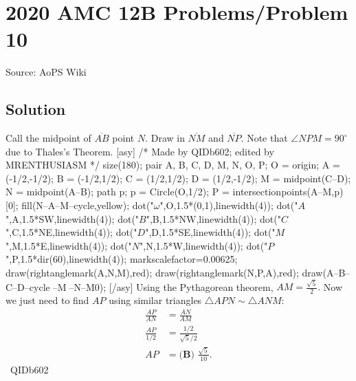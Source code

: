 \documentclass[12pt]{article}
\begin{document}
\section*{{2020 AMC 12B Problems/Problem 10}}
Source: AoPS Wiki

\subsection*{Solution}
Call the midpoint of $\overline{AB}$ point $N.$ Draw in $\overline{NM}$ and $\overline{NP}.$ Note that $\angle{NPM}=90^{\circ}$ due to Thales's Theorem. [asy] /* Made by QIDb602; edited by MRENTHUSIASM */ size(180); pair A, B, C, D, M, N, O, P; O = origin; A = (-1/2,-1/2); B = (-1/2,1/2); C = (1/2,1/2); D = (1/2,-1/2); M = midpoint(C--D); N = midpoint(A--B); path p; p = Circle(O,1/2); P = intersectionpoints(A--M,p)[0]; fill(N--A--M--cycle,yellow); dot("$\omega$",O,1.5*(0,1),linewidth(4)); dot("$A$",A,1.5*SW,linewidth(4)); dot("$B$",B,1.5*NW,linewidth(4)); dot("$C$",C,1.5*NE,linewidth(4)); dot("$D$",D,1.5*SE,linewidth(4)); dot("$M$",M,1.5*E,linewidth(4)); dot("$N$",N,1.5*W,linewidth(4)); dot("$P$",P,1.5*dir(60),linewidth(4)); markscalefactor=0.00625; draw(rightanglemark(A,N,M),red); draw(rightanglemark(N,P,A),red); draw(A--B--C--D--cycle^^A--M^^P--N--M^^p); [/asy] Using the Pythagorean theorem, $AM=\frac{\sqrt{5}}{2}.$ Now we just need to find $AP$ using similar triangles $\triangle APN\sim\triangle ANM:$ \begin{align*} \frac{AP}{AN}&=\frac{AN}{AM} \\ \frac{AP}{1/2}&=\frac{1/2}{\sqrt5/2} \\ AP&=\boxed{\textbf{(B) } \frac{\sqrt5}{10}}. \end{align*} ~QIDb602
\end{document}
